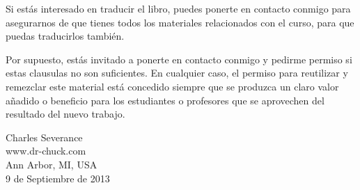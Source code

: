 Si estás interesado en traducir el libro, puedes ponerte en contacto conmigo
para asegurarnos de que tienes todos los materiales relacionados con el curso,
para que puedas traducirlos también.

Por supuesto, estás invitado a ponerte en contacto conmigo y pedirme permiso si estas
clausulas no son suficientes. En cualquier caso, el permiso para reutilizar y
remezclar este material está concedido siempre que se produzca un claro valor añadido
o beneficio para los estudiantes o profesores que se aprovechen del resultado
del nuevo trabajo.

Charles Severance\\
www.dr-chuck.com\\
Ann Arbor, MI, USA\\
9 de Septiembre de 2013



\normalsize

\printindex

\clearemptydoublepage



